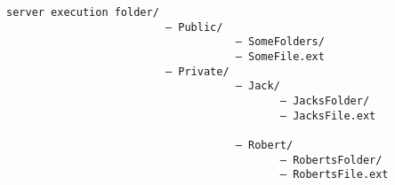 \begin{verbatim}
server execution folder/
                         — Public/
                                    — SomeFolders/
                                    — SomeFile.ext
                         — Private/
                                    — Jack/
                                           — JacksFolder/
                                           — JacksFile.ext

                                    — Robert/
                                           — RobertsFolder/
                                           — RobertsFile.ext
\end{verbatim}   
